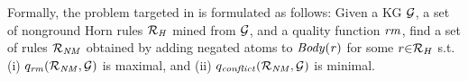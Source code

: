 
Formally, the problem targeted in \cite{gad2016,rumis} is formulated as follows: Given a KG $\mathcal{G}$,
a set of nonground Horn rules $\mathcal{R}_{\mathit{H}}$ mined from $\mathcal{G}$, and a quality
function $\mathit{rm}$, %
find a set of rules $\mathcal{R}_{\mathit{NM}}$ obtained by
adding negated atoms to $\mathit{Body(r)}$ for some $r{\in} \mathcal{R}_{H}$ s.t. (i)
${q_{\mathit{rm}}(\mathcal{R}_{\mathit{NM}},\mathcal{G})}$ is maximal, and (ii)
${q_{\mathit{conflict}}(\mathcal{R}_{\mathit{NM}},\mathcal{G})}$ is minimal.


